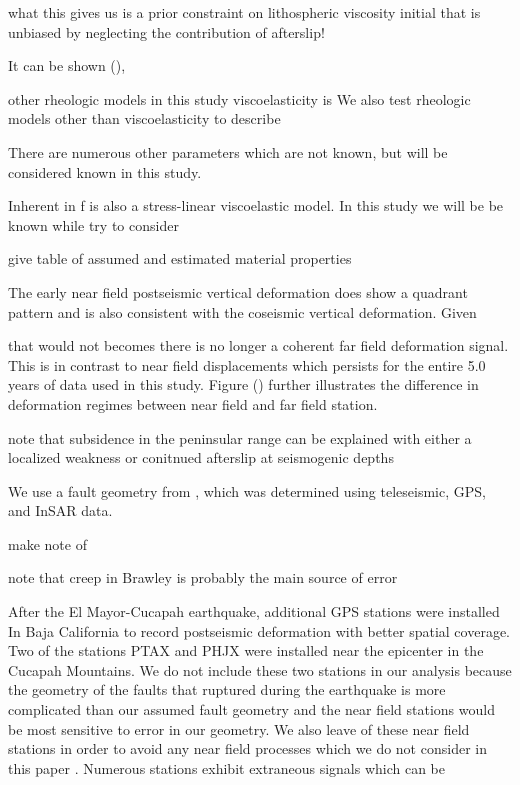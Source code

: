 \documentclass[12pt]{article}
\begin{document}
what this gives us is a prior constraint on lithospheric viscosity initial that is unbiased by neglecting the contribution of afterslip! 


It can be shown (\cite{Hines2015}),     

other rheologic models in this study      viscoelasticity is We also test rheologic models other than viscoelasticity to describe    




There are numerous other parameters which are not known, but will be considered known in this study.   


   Inherent in f is also a stress-linear viscoelastic model.   In this study we will be be known while try to consider             

   give table of assumed and estimated material properties 

   The early near field postseismic vertical deformation does show a quadrant pattern and is also consistent with the coseismic vertical deformation.  Given         

that would not becomes there is no longer a coherent far field deformation signal. This is in contrast to near field displacements which persists for the entire 5.0 years of data used in this study. Figure () further illustrates the difference in deformation regimes between near field and far field station.  

note that subsidence in the peninsular range can be explained with either a localized weakness or conitnued afterslip at seismogenic depths

We use a fault geometry from \cite{Wei2011}, which was determined using teleseismic, GPS, and InSAR data.  

make note of \cite{Yamagiwa2014}

note that creep in Brawley is probably the main source of error

After the El Mayor-Cucapah earthquake, additional GPS stations were installed In Baja California to record postseismic deformation with better spatial coverage.  Two of the stations PTAX and PHJX were installed near the epicenter in the Cucapah Mountains.  We do not include these two stations in our analysis because the geometry of the faults that ruptured during the earthquake is more complicated than our assumed fault geometry \cite{Oskin2012} \cite{Fletcher2014} and the near field stations would be most sensitive to error in our geometry. We also leave of these near field stations in order to avoid any near field processes which we do not consider in this paper \cite{Gonzalez-ortega2014}. Numerous stations exhibit extraneous signals which can be 
\end{document}
